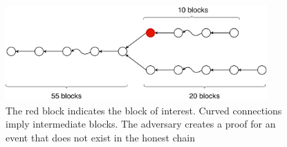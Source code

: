 \begin{figure}[hbt]
    \centering
    \includegraphics[width=10cm]{./images/proofs_65-10+20.pdf}
    \caption{The red block indicates the block of interest. Curved connections
        imply intermediate blocks. The adversary creates a proof for an event
        that does not exist in the honest chain}
    \label{figure:proofs_65-10+20}
\end{figure}
